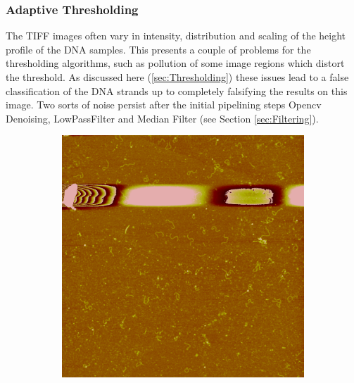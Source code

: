 \documentclass{article}
\begin{document}
\subsubsection{Adaptive Thresholding}
The TIFF images often vary in intensity, distribution and scaling of the height profile of the DNA samples. This presents a couple of problems for the thresholding algorithms, such as pollution of some image regions which distort the threshold. As discussed here (\ref{sec:Thresholding}) these issues lead to a false classification of the DNA strands up to completely falsifying the results on this image.
Two sorts of noise persist after the initial pipelining steps  
Opencv Denoising, LowPassFilter and Median Filter (see Section \ref{sec:Filtering}).
\begin{figure}[!htb]
	\begin{subfigure}{0.5\textwidth}
		\includegraphics[width=\linewidth]{noise1.png}
		\caption{}
		\label{fig: Noise1}
	\end{subfigure}%
	\hspace{\fill}
	\begin{subfigure}{0.5\textwidth}

\end{subfigure}
\end{figure}
\end{document}
